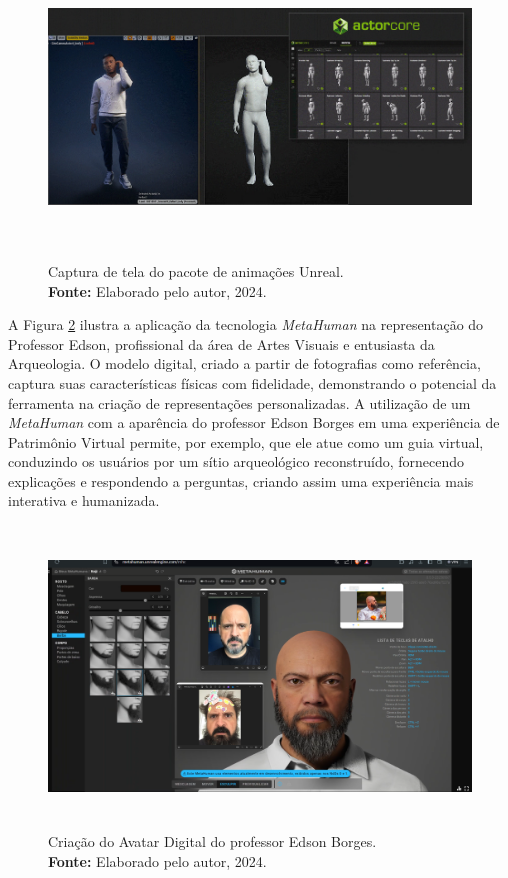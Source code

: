 {\begin{figure}[H]
    \centering
    \includegraphics[height=8cm, keepaspectratio]{gif/animacoes/feature_body_motion-0000.jpg}
    \caption{ Captura de tela do pacote de animações Unreal.\\
        \textbf{Fonte:} Elaborado pelo autor, 2024.}
    \label{fig:animacoes}
\end{figure}


A Figura \ref{fig:metahumanEdson} ilustra a aplicação da tecnologia \textit{MetaHuman} na representação do Professor Edson, profissional da área de Artes Visuais e entusiasta da Arqueologia. O modelo digital, criado a partir de fotografias como referência, captura suas características físicas com fidelidade, demonstrando o potencial da ferramenta na criação de representações personalizadas. A utilização de um \textit{MetaHuman} com a aparência do professor Edson Borges em uma experiência de Patrimônio Virtual permite, por exemplo, que ele atue como um guia virtual, conduzindo os usuários por um sítio arqueológico reconstruído, fornecendo explicações e respondendo a perguntas, criando assim uma experiência mais interativa e humanizada.

\begin{figure}[H]
    \centering
    \includegraphics[height=8cm, keepaspectratio]{img/Metahuman.png}
    \caption{Criação do Avatar Digital do professor Edson Borges. \\
        \textbf{Fonte:} Elaborado pelo autor, 2024.}
    \label{fig:metahumanEdson}
\end{figure}



}
